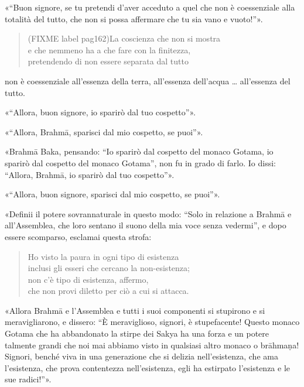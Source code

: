«“Buon signore, se tu pretendi d’aver acceduto a quel che non è
coessenziale alla totalità del tutto, che non si possa affermare che tu
sia vano e vuoto!”».


\begin{quotation}
(FIXME label pag162)La coscienza che non si mostra \\
e che nemmeno ha a che fare con la finitezza, \\
pretendendo di non essere separata dal tutto
\end{quotation}

non è coessenziale all’essenza della terra, all’essenza dell’acqua …
all’essenza del tutto.


«“Allora, buon signore, io sparirò dal tuo cospetto”».


«“Allora, Brahmā, sparisci dal mio cospetto, se puoi”».


«Brahmā Baka, pensando: “Io sparirò dal cospetto del monaco Gotama, io
sparirò dal cospetto del monaco Gotama”, non fu in grado di farlo. Io
dissi: “Allora, Brahmā, io sparirò dal tuo cospetto”».


«“Allora, buon signore, sparisci dal mio cospetto, se puoi”».


«Definii il potere sovrannaturale in questo modo: “Solo in relazione a
Brahmā e all’Assemblea, che loro sentano il suono della mia voce senza
vedermi”, e dopo essere scomparso, esclamai questa strofa:


\begin{quotation}
Ho visto la paura in ogni tipo di esistenza \\
inclusi gli esseri che cercano la non-esistenza; \\
non c’è tipo di esistenza, affermo, \\
che non provi diletto per ciò a cui si attacca.
\end{quotation}

«Allora Brahmā e l’Assemblea e tutti i suoi componenti si stupirono e si
meravigliarono, e dissero: “È meraviglioso, signori, è stupefacente!
Questo monaco Gotama che ha abbandonato la stirpe dei Sakya ha una forza
e un potere talmente grandi che noi mai abbiamo visto in qualsiasi altro
monaco o brāhmaṇa! Signori, benché viva in una generazione che si
delizia nell’esistenza, che ama l’esistenza, che prova contentezza
nell’esistenza, egli ha estirpato l’esistenza e le sue radici!”».


